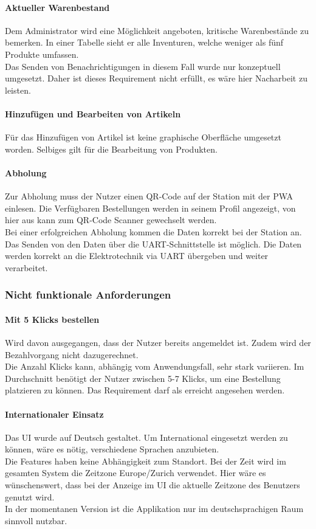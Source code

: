 \paragraph{Aktueller Warenbestand}
Dem Administrator wird eine Möglichkeit angeboten, kritische Warenbestände zu bemerken. In einer Tabelle sieht er alle Inventuren, welche weniger als fünf Produkte umfassen. \\
Das Senden von Benachrichtigungen in diesem Fall wurde nur konzeptuell umgesetzt. Daher ist dieses Requirement nicht erfüllt, es wäre hier Nacharbeit zu leisten. 

\paragraph{Hinzufügen und Bearbeiten von Artikeln}
Für das Hinzufügen von Artikel ist keine graphische Oberfläche umgesetzt worden. Selbiges gilt für die Bearbeitung von Produkten.

\paragraph{Abholung}
Zur Abholung muss der Nutzer einen QR-Code auf der Station mit der \gls{PWA} einlesen. Die Verfügbaren Bestellungen werden in seinem Profil angezeigt, von hier aus kann zum QR-Code Scanner gewechselt werden. \\
Bei einer erfolgreichen Abholung kommen die Daten korrekt bei der Station an. Das Senden von den Daten über die \ac{UART}-Schnittstelle ist möglich. Die Daten werden korrekt an die Elektrotechnik via \ac{UART} übergeben und weiter verarbeitet. 

\subsubsection{Nicht funktionale Anforderungen}
\paragraph{Mit 5 Klicks bestellen}
Wird davon ausgegangen, dass der Nutzer bereits angemeldet ist. Zudem wird der Bezahlvorgang nicht dazugerechnet. \\
Die Anzahl Klicks kann, abhängig vom Anwendungsfall, sehr stark variieren. Im Durchschnitt benötigt der Nutzer zwischen 5-7 Klicks, um eine Bestellung platzieren zu können. Das Requirement darf als erreicht angesehen werden. 

\paragraph{Internationaler Einsatz}
Das UI wurde auf Deutsch gestaltet. Um International eingesetzt werden zu können, wäre es nötig, verschiedene Sprachen anzubieten.\\ Die Features haben keine Abhängigkeit zum Standort. Bei der Zeit wird im gesamten System die Zeitzone Europe/Zurich verwendet. Hier wäre es wünschenswert, dass bei der Anzeige im \ac{UI} die aktuelle Zeitzone des Benutzers genutzt wird. \\
In der momentanen Version ist die Applikation nur im deutschsprachigen Raum sinnvoll nutzbar. 

